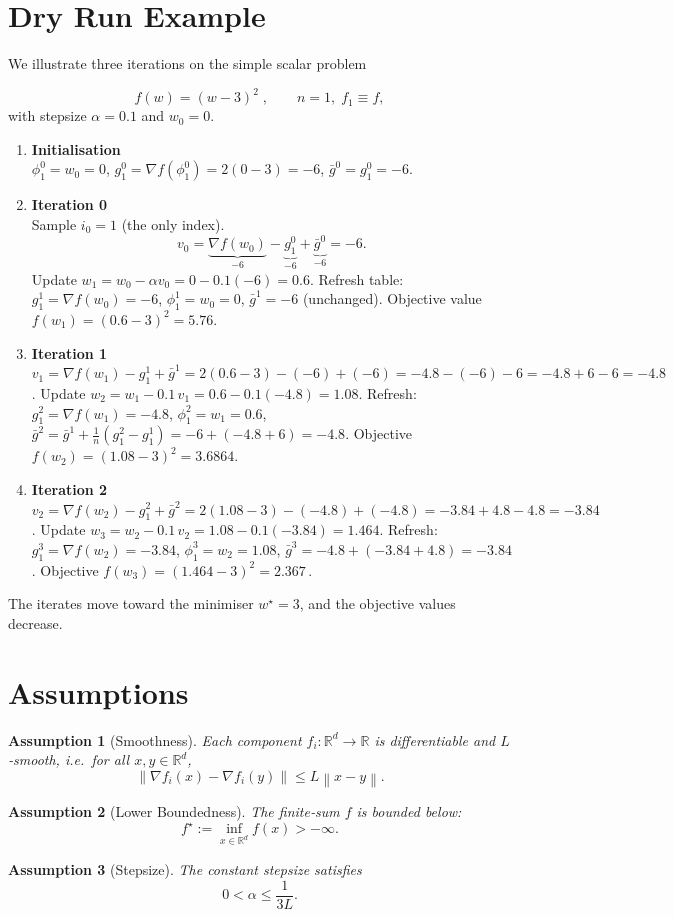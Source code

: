 \documentclass{article}
\newtheorem{assumption}{Assumption}
\newcommand{\R}{\mathbb{R}}
\newcommand{\norm}[1]{\left\|#1\right\|}
\begin{document}
\section*{Dry Run Example}
We illustrate three iterations on the simple scalar problem  

\[
f(w)= (w-3)^2\; ,\qquad n=1,\; f_1\equiv f,
\]
with stepsize $\alpha=0.1$ and $w_0=0$.

\begin{enumerate}[label=\textbf{Iter \arabic*:},leftmargin=*,itemsep=2mm]
\item \textbf{Initialisation}\\
$\phi_1^{0}=w_0=0$, $g_1^{0}= \nabla f(\phi_1^{0})=2(0-3)=-6$, 
$\bar g^{0}=g_1^{0}=-6$.
\item \textbf{Iteration 0}\\
Sample $i_0=1$ (the only index).  
\[
v_0 = \underbrace{\nabla f(w_0)}_{-6}
      -\underbrace{g_1^{0}}_{-6}
      +\underbrace{\bar g^{0}}_{-6}= -6 .
\]
Update $w_1 = w_0-\alpha v_0 = 0-0.1(-6)=0.6$.  
Refresh table: $g_1^{1}= \nabla f(w_0)=-6$, $\phi_1^{1}=w_0=0$, 
$\bar g^{1}= -6$ (unchanged).  
Objective value $f(w_1)=(0.6-3)^2=5.76$.
\item \textbf{Iteration 1}\\
$v_1 = \nabla f(w_1)-g_1^{1}+\bar g^{1}
      = 2(0.6-3)-(-6)+(-6)= -4.8-(-6)-6 = -4.8+6-6 = -4.8$.
Update $w_2 = w_1-0.1\,v_1 = 0.6-0.1(-4.8)=1.08$.  
Refresh: $g_1^{2}= \nabla f(w_1)=-4.8$, $\phi_1^{2}=w_1=0.6$,  
$\bar g^{2}= \bar g^{1}+\frac1n(g_1^{2}-g_1^{1})
            =-6+(-4.8+6)= -4.8$.  
Objective $f(w_2)=(1.08-3)^2=3.6864$.
\item \textbf{Iteration 2}\\
$v_2 = \nabla f(w_2)-g_1^{2}+\bar g^{2}
      = 2(1.08-3)-(-4.8)+(-4.8)= -3.84+4.8-4.8 = -3.84$.
Update $w_3 = w_2-0.1\,v_2 = 1.08-0.1(-3.84)=1.464$.  
Refresh: $g_1^{3}= \nabla f(w_2)=-3.84$, $\phi_1^{3}=w_2=1.08$,  
$\bar g^{3}= -4.8+(-3.84+4.8)= -3.84$.  
Objective $f(w_3)=(1.464-3)^2=2.367\,.$
\end{enumerate}
The iterates move toward the minimiser $w^{\star}=3$, and the
objective values decrease.

\section*{Assumptions}
\begin{assumption}[Smoothness]\label{ass:smooth}
Each component $f_i:\R^{d}\to\R$ is differentiable and $L$‑smooth,
i.e.\ for all $x,y\in\R^{d}$,
\[
\norm{\nabla f_i(x)-\nabla f_i(y)}\le L\norm{x-y}.
\tag{A1}
\]
\end{assumption}
\begin{assumption}[Lower Boundedness]\label{ass:lb}
The finite‑sum $f$ is bounded below:
\[
f^{\star}:=\inf_{x\in\R^{d}}f(x)>-\infty .
\tag{A2}
\]
\end{assumption}
\begin{assumption}[Stepsize]\label{ass:step}
The constant stepsize satisfies 
\[
0<\alpha\le\frac{1}{3L}.
\tag{A3}
\]
\end{assumption}
\end{document}
